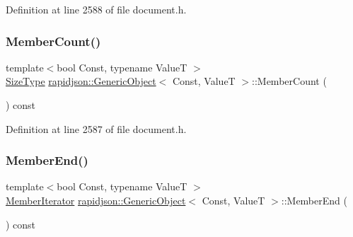 Definition at line 2588 of file document.\+h.


\begin{DoxyCode}{0}

\end{DoxyCode}
\mbox{\label{classrapidjson_1_1_generic_object_a583962734202dfdf22ab851d78f24d92}} 
\subsubsection{\texorpdfstring{MemberCount()}{MemberCount()}}
{\footnotesize\ttfamily template$<$bool Const, typename ValueT $>$ \\
\mbox{\hyperlink{namespacerapidjson_a44eb33eaa523e36d466b1ced64b85c84}{Size\+Type}} \mbox{\hyperlink{classrapidjson_1_1_generic_object}{rapidjson\+::\+Generic\+Object}}$<$ Const, ValueT $>$\+::Member\+Count (\begin{DoxyParamCaption}{ }\end{DoxyParamCaption}) const}



Definition at line 2587 of file document.\+h.


\begin{DoxyCode}{0}

\end{DoxyCode}
\mbox{\label{classrapidjson_1_1_generic_object_a446032e977f37638cf3c44eb3a972fdd}} 
\subsubsection{\texorpdfstring{MemberEnd()}{MemberEnd()}}
{\footnotesize\ttfamily template$<$bool Const, typename ValueT $>$ \\
\mbox{\hyperlink{classrapidjson_1_1_generic_object_a598fd1d5f55289eca275847f0e8ef295}{Member\+Iterator}} \mbox{\hyperlink{classrapidjson_1_1_generic_object}{rapidjson\+::\+Generic\+Object}}$<$ Const, ValueT $>$\+::Member\+End (\begin{DoxyParamCaption}{ }\end{DoxyParamCaption}) const}



